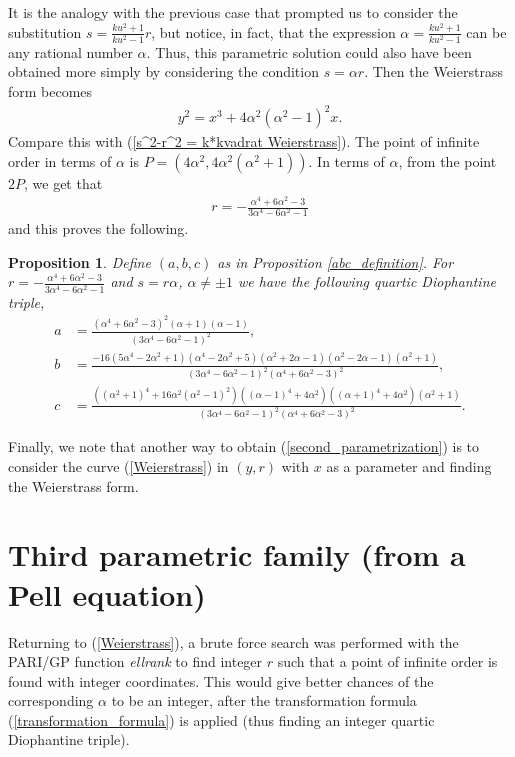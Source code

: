 \documentclass{amsart}
\newtheorem{prop}{Proposition}
\begin{document}
It is the analogy with the previous case that prompted us to consider the substitution $s = \frac{ku^2+1}{ku^2-1}r$, but notice, in fact, that the expression $\alpha = \frac{ku^2+1}{ku^2-1}$ can be any rational number $\alpha$. Thus, this parametric solution could also have been  obtained more simply by considering the condition $s=\alpha r$. Then the Weierstrass form becomes
\begin{align} \label{second_parametrization}
    y^2 = x^3+4\alpha^2(\alpha^2-1)^2x.
\end{align}
Compare this with (\ref{s^2-r^2 = k*kvadrat Weierstrass}). The point of infinite order in terms of $\alpha$ is $P=(4\alpha^2, 4\alpha^2(\alpha^2+1))$. In terms of $\alpha$, from the point $2P$, we get that
\begin{align*}
    r = -\frac{\alpha^4 + 6\alpha^2 - 3}{3\alpha^4 - 6\alpha^2 - 1}
\end{align*}
and this proves the following.
\begin{prop}
    Define $(a,b,c)$ as in Proposition \ref{abc_definition}. For $r = -\frac{\alpha^4 + 6\alpha^2 - 3}{3\alpha^4 - 6\alpha^2 - 1}$ and $s=r\alpha$, $\alpha\neq \pm 1$ we have the following quartic Diophantine triple,
\begin{align*}
a &= \frac{(\alpha^4 + 6\alpha^2 - 3)^2 (\alpha+1)(\alpha-1)}{(3\alpha^4 - 6\alpha^2 - 1)^2}, \\
b &= \frac{-16(5\alpha^4 - 2\alpha^2 + 1)(\alpha^4 - 2\alpha^2 + 5)(\alpha^2 + 2\alpha - 1)(\alpha^2 - 2\alpha - 1)(\alpha^2 + 1)}{(3\alpha^4 - 6\alpha^2 - 1)^2 (\alpha^4 + 6\alpha^2 - 3)^2}, \\
c &= \frac{\left((\alpha^2+1)^4+16\alpha^2(\alpha^2-1)^2\right) \left((\alpha-1)^4+4\alpha^2 \right) \left((\alpha+1)^4+4\alpha^2\right)(\alpha^2 + 1)}{(3\alpha^4 - 6\alpha^2 - 1)^2 (\alpha^4 + 6\alpha^2 - 3)^2}.
\end{align*}
\end{prop}
Finally, we note that another way to obtain (\ref{second_parametrization}) is to consider the curve (\ref{Weierstrass}) in $(y,r)$ with $x$ as a parameter and finding the Weierstrass form.

\section{Third parametric family (from a Pell equation)}

Returning to (\ref{Weierstrass}), a brute force search was performed with the PARI/GP function \emph{ellrank} to find integer $r$ such that a point of infinite order is found with integer coordinates. This would give better chances of the corresponding $\alpha$ to be an integer, after the transformation formula (\ref{transformation_formula}) is applied (thus finding an integer quartic Diophantine triple).
\end{document}
